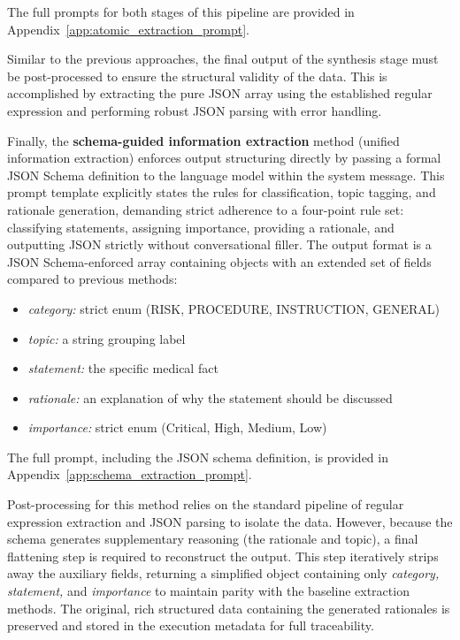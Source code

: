 The full prompts for both stages of this pipeline are provided in Appendix~\ref{app:atomic_extraction_prompt}.

Similar to the previous approaches, the final output of the synthesis stage must be post-processed to ensure the structural validity of the data. This is accomplished by extracting the pure JSON array using the established regular expression and performing robust JSON parsing with error handling.

Finally, the \textbf{schema-guided information extraction} method (unified information extraction) enforces output structuring directly by passing a formal JSON Schema definition to the language model within the system message. 
This prompt template explicitly states the rules for classification, topic tagging, and rationale generation, demanding strict adherence to a four-point rule set: classifying statements, assigning importance, providing a rationale, and outputting JSON strictly without conversational filler.
The output format is a JSON Schema-enforced array containing objects with an extended set of fields compared to previous methods:
\begin{itemize}
    \item \textit{category:} strict enum (RISK, PROCEDURE, INSTRUCTION, GENERAL)
    \item \textit{topic:} a string grouping label
    \item \textit{statement:} the specific medical fact
    \item \textit{rationale:} an explanation of why the statement should be discussed
    \item \textit{importance:} strict enum (Critical, High, Medium, Low)
\end{itemize}

The full prompt, including the JSON schema definition, is provided in Appendix~\ref{app:schema_extraction_prompt}.

Post-processing for this method relies on the standard pipeline of regular expression extraction and JSON parsing to isolate the data. However, because the schema generates supplementary reasoning (the rationale and topic), a final flattening step is required to reconstruct the output. This step iteratively strips away the auxiliary fields, returning a simplified object containing only \textit{category, statement,} and \textit{importance} to maintain parity with the baseline extraction methods. The original, rich structured data containing the generated rationales is preserved and stored in the execution metadata for full traceability.

